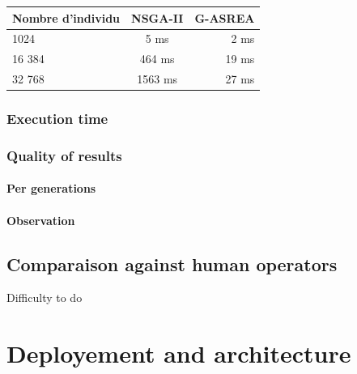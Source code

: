 \documentclass[12pt]{memoir}
\begin{document}
\begin{center}
	\begin{tabular}{ |l| c| r| }
		\hline
		Nombre d'individu & NSGA-II & G-ASREA \\
		\hline
		1024 & 5 ms & 2 ms \\
		16 384 & 464 ms & 19 ms\\
		32 768  & 1563 ms& 27 ms\\
		\hline
	\end{tabular}
\end{center}

\subsubsection{Execution time}
\subsubsection{Quality of results}

\paragraph{Per generations}

\paragraph{Observation}

\subsection{Comparaison against human operators}
Difficulty to do 

\section{Deployement and architecture}
\end{document}
